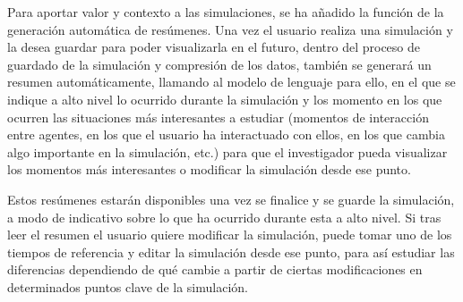 Para aportar valor y contexto a las simulaciones, se ha añadido la función de la generación automática de resúmenes. Una vez el usuario realiza una simulación y la desea guardar para poder visualizarla en el futuro, dentro del proceso de guardado de la simulación y compresión de los datos, también se generará un resumen automáticamente, llamando al modelo de lenguaje para ello, en el que se indique a alto nivel lo ocurrido durante la simulación y los momento en los que ocurren las situaciones más interesantes a estudiar (momentos de interacción entre agentes, en los que el usuario ha interactuado con ellos, en los que cambia algo importante en la simulación, etc.) para que el investigador pueda visualizar los momentos más interesantes o modificar la simulación desde ese punto.

Estos resúmenes estarán disponibles una vez se finalice y se guarde la simulación, a modo de indicativo sobre lo que ha ocurrido durante esta a alto nivel. Si tras leer el resumen el usuario quiere modificar la simulación, puede tomar uno de los tiempos de referencia y editar la simulación desde ese punto, para así estudiar las diferencias dependiendo de qué cambie a partir de ciertas modificaciones en determinados puntos clave de la simulación.\\

